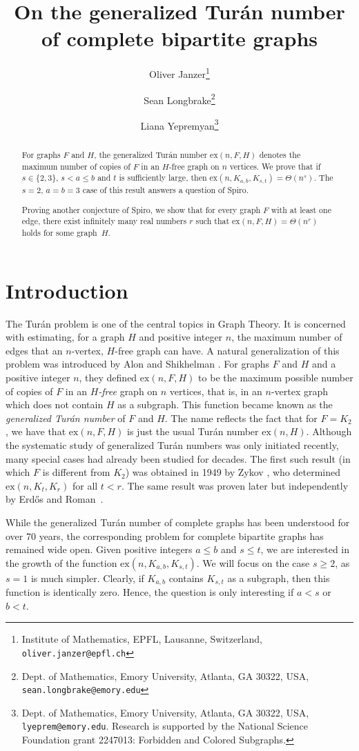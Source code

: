 \documentclass[12pt]{article}
\title{On the generalized Tur\'an number of complete bipartite graphs}
\author{Oliver Janzer\footnote{Institute of Mathematics, EPFL,  Lausanne, Switzerland, {\tt oliver.janzer@epfl.ch}} \and Sean Longbrake\footnote{Dept. of Mathematics, Emory University,  Atlanta, GA 30322, USA, {\tt sean.longbrake@emory.edu}} \and Liana Yepremyan\footnote{Dept. of Mathematics, Emory University,  Atlanta, GA 30322, USA, {\tt lyeprem@emory.edu}.  Research is supported by the National Science Foundation grant 2247013: Forbidden and Colored Subgraphs.}}
\date{}
\newcommand{\ex}{\mathrm{ex}}
\begin{document}
\maketitle


\begin{abstract}
    For graphs $F$ and $H$, the generalized Tur\'an number $\mathrm{ex}(n,F,H)$ denotes the maximum number of copies of $F$ in an $H$-free graph on $n$ vertices. We prove that if $s\in \{2,3\}$, $s< a\leq b$ and $t$ is sufficiently large, then $\mathrm{ex}(n,K_{a,b},K_{s,t})=\Theta(n^s)$. The $s=2$, $a=b=3$ case of this result answers a question of Spiro.

    Proving another conjecture of Spiro, we show that for every graph $F$ with at least one edge, there exist infinitely many real numbers $r$ such that $\mathrm{ex}(n,F,H)=\Theta(n^r)$ holds for some graph~$H$.
\end{abstract}

\section{Introduction}

The Tur\'an problem is one of the central topics in Graph Theory. It is concerned with estimating, for a graph $H$ and positive integer $n$, the maximum number of edges that an $n$-vertex, $H$-free graph can have. A natural generalization of this problem was introduced by Alon and Shikhelman \cite{alon2016many}. For graphs $F$ and $H$ and a positive integer $n$, they defined $\ex(n,F,H)$ to be the maximum possible number of copies of $F$ in an \emph{$H$-free} graph on $n$ vertices, that is, in an $n$-vertex graph which does not contain $H$ as a subgraph. This function became known as the \emph{generalized Tur\'an number} of $F$ and $H$. The name reflects the fact that for $F=K_2$, we have that $\ex(n,F,H)$ is just the usual Tur\'an number $\ex(n,H)$. Although the systematic study of generalized Tur\'an numbers was only initiated recently, many special cases had already been studied for decades. The first such result (in which $F$ is different from $K_2$) was obtained in 1949 by Zykov \cite{Zyk49}, who determined $\ex(n,K_t,K_r)$ for all $t<r$. The same result was proven later but independently by Erd\H os \cite{Erd62} and Roman~\cite{Rom76}.

While the generalized Tur\'an number of complete graphs has been understood for over 70 years, the corresponding problem for complete bipartite graphs has remained wide open. Given positive integers $a\leq b$ and $s\leq t$, we are interested in the growth of the function $\ex(n,K_{a,b},K_{s,t})$. We will focus on the case $s\geq 2$, as $s=1$ is much simpler. Clearly, if $K_{a,b}$ contains $K_{s,t}$ as a subgraph, then this function is identically zero. Hence, the question is only interesting if $a<s$ or $b<t$. 
\end{document}
